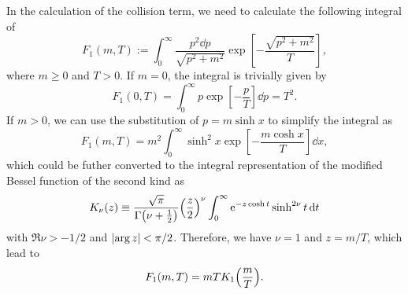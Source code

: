 \documentclass{article}
\begin{document}
            In the calculation of the collision term, we need to calculate the following integral of
            \begin{equation}
                F_1(m, T) := \int_0^\infty \frac{p^2 \dd{p}}{\sqrt{p^2 + m^2}} \exp[-\frac{\sqrt{p^2 + m^2}}{T}],
                \label{eq:F_1-definition}
            \end{equation}
            where $m \ge 0$ and $T > 0$.
            If $m = 0$, the integral is trivially given by
            \begin{equation}
                F_1(0, T) = \int_0^\infty p \exp[-\frac{p}{T}] \dd{p} = T^2.
                \label{eq:F_1-evaluation-m=0}
            \end{equation}
            If $m > 0$, we can use the substitution of $p = m \sinh x$ to simplify the integral as
            \begin{equation}
                F_1(m, T) = m^2 \int_0^\infty \sinh^2 x \exp[-\frac{m \cosh x}{T}] \dd{x},
            \end{equation}
            which could be futher converted to the integral representation of the modified Bessel function of the second kind as \cite[Eq.~(\href{https://dlmf.nist.gov/10.32.8}{10.32.8})]{NIST:DLMF}
            \begin{equation}
                K_\nu(z) \equiv \frac{\sqrt{\pi}}{\Gamma\qty(\nu + \frac{1}{2})} \qty(\frac{z}{2})^\nu \int_0^\infty \mathrm{e}^{-z \cosh t} \sinh^{2 \nu} t \dd{t}
            \end{equation}
            with $\Re \nu > -1 / 2$ and $\abs{\arg z} < \pi / 2$.
            Therefore, we have $\nu = 1$ and $z = m / T$, which lead to
            \begin{equation}
                F_1(m, T) = m T K_1\qty(\frac{m}{T}).
                \label{eq:F_1-evaluation}
            \end{equation}
            
\end{document}
